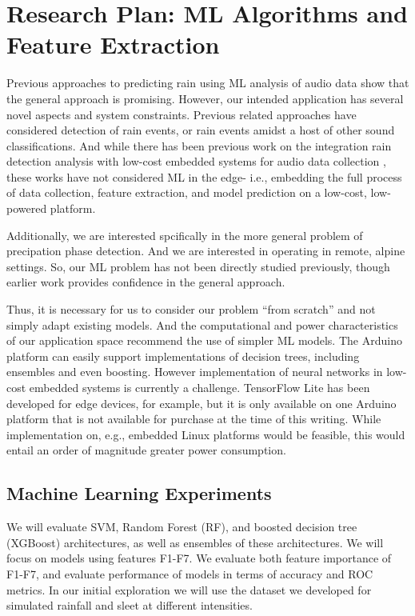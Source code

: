 \section{Research Plan: ML Algorithms and Feature Extraction}

Previous approaches to predicting rain using ML analysis of audio data
show that the general approach is promising. However, our intended
application has several novel aspects and system constraints. Previous
related approaches have considered detection of rain events, or rain
events amidst a host of other sound classifications. And while there
has been previous work on the integration rain detection analysis with
low-cost embedded systems for audio data collection
\cite{Avanzato_Fransesco_et_al.,Guico_et_al.}, these works have not
considered ML in the edge- i.e., embedding the full process of data
collection, feature extraction, and model prediction on a low-cost,
low-powered platform.

Additionally, we are interested spcifically in the more general
problem of precipation phase detection. And we are interested in
operating in remote, alpine settings. So, our ML problem has not
been directly studied previously, though earlier work provides
confidence in the general approach. 

Thus, it is necessary for us to consider our problem ``from scratch''
and not simply adapt existing models. And the computational and power
characteristics of our application space recommend the use of simpler
ML models. The Arduino platform can easily support implementations of
decision trees, including ensembles and even boosting. However
implementation of neural networks in low-cost embedded systems is
currently a challenge. TensorFlow Lite has been developed for edge
devices, for example, but it is only available on one Arduino platform
that is not available for purchase at the time of this writing. While
implementation on, e.g., embedded Linux platforms would be feasible,
this would entail an order of magnitude greater power consumption.

\subsection{Machine Learning Experiments}

We will evaluate SVM, Random Forest (RF), and boosted decision tree
(XGBoost) architectures, as well as ensembles of these architectures.
We will focus on models using features F1-F7. We evaluate both feature
importance of F1-F7, and evaluate performance of models in terms of
accuracy and ROC metrics. In our initial exploration we will use
the dataset we developed for simulated rainfall and sleet at different
intensities.
